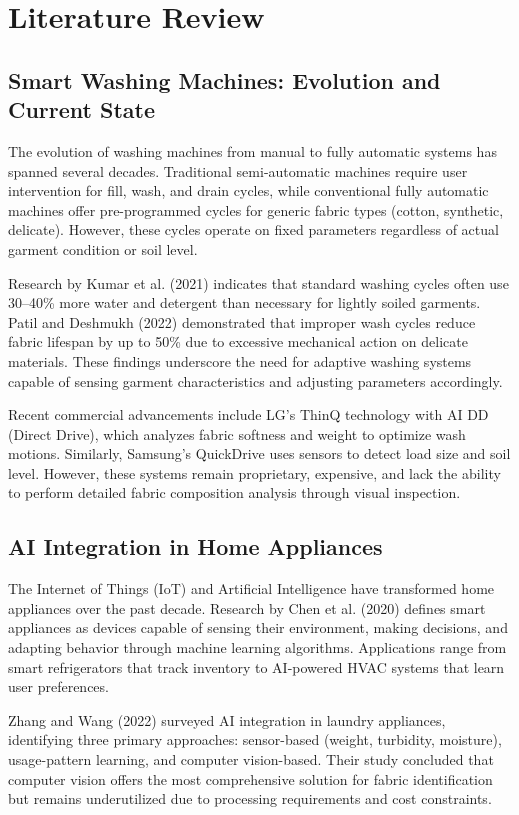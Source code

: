 \chapter{Literature Review}

\section{Smart Washing Machines: Evolution and Current State}
The evolution of washing machines from manual to fully automatic systems has spanned several decades. Traditional semi-automatic machines require user intervention for fill, wash, and drain cycles, while conventional fully automatic machines offer pre-programmed cycles for generic fabric types (cotton, synthetic, delicate). However, these cycles operate on fixed parameters regardless of actual garment condition or soil level.

Research by Kumar et al. (2021) indicates that standard washing cycles often use 30–40\% more water and detergent than necessary for lightly soiled garments. Patil and Deshmukh (2022) demonstrated that improper wash cycles reduce fabric lifespan by up to 50\% due to excessive mechanical action on delicate materials. These findings underscore the need for adaptive washing systems capable of sensing garment characteristics and adjusting parameters accordingly.

Recent commercial advancements include LG's ThinQ technology with AI DD (Direct Drive), which analyzes fabric softness and weight to optimize wash motions. Similarly, Samsung's QuickDrive uses sensors to detect load size and soil level. However, these systems remain proprietary, expensive, and lack the ability to perform detailed fabric composition analysis through visual inspection.

\section{AI Integration in Home Appliances}
The Internet of Things (IoT) and Artificial Intelligence have transformed home appliances over the past decade. Research by Chen et al. (2020) defines smart appliances as devices capable of sensing their environment, making decisions, and adapting behavior through machine learning algorithms. Applications range from smart refrigerators that track inventory to AI-powered HVAC systems that learn user preferences.

Zhang and Wang (2022) surveyed AI integration in laundry appliances, identifying three primary approaches: sensor-based (weight, turbidity, moisture), usage-pattern learning, and computer vision-based. Their study concluded that computer vision offers the most comprehensive solution for fabric identification but remains underutilized due to processing requirements and cost constraints.

